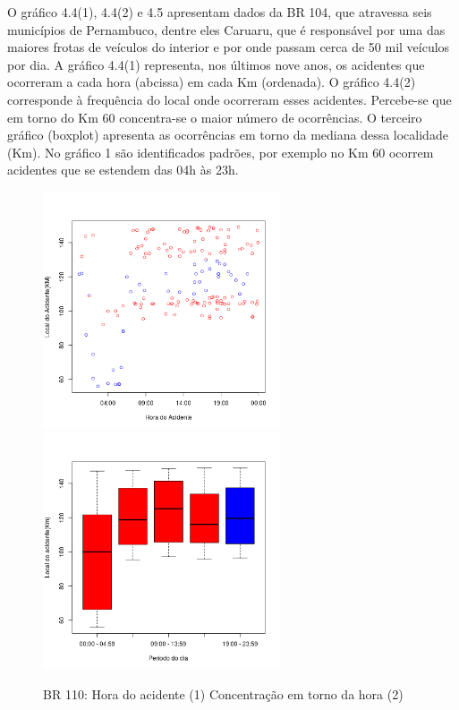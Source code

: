 O gráfico 4.4(1), 4.4(2) e 4.5 apresentam dados da BR 104, que atravessa seis municípios de Pernambuco, dentre eles Caruaru, que é responsável por uma das maiores frotas de veículos do interior e por onde passam cerca de 50 mil veículos por dia. 
A gráfico 4.4(1) representa, nos últimos nove anos, os acidentes que ocorreram a cada hora (abcissa) em cada Km (ordenada).
O  gráfico 4.4(2) corresponde à frequência do local onde ocorreram esses acidentes. 
Percebe-se que em torno do Km 60 concentra-se o maior número de ocorrências. 
O terceiro gráfico (boxplot) apresenta as ocorrências em torno da mediana dessa localidade (Km). 
No gráfico 1 são identificados padrões, por exemplo no Km 60 ocorrem acidentes que se estendem das 04h às 23h. 


\pagebreak

\begin{figure}[h]
	\caption{BR 110: Hora do acidente (1)  Concentração em torno da hora (2)}
	\includegraphics[width=7cm,height=7cm]{Figuras/Preprocess/br110_1.png}
	\includegraphics[width=7cm,height=7cm]{Figuras/Preprocess/br110_2.png}

\end{figure}


